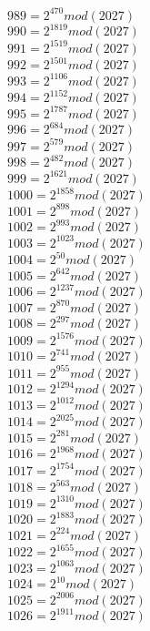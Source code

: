 \documentclass[12pt, letterpaper]{article}
\begin{document}
\begin{itemize}
\begin{multicols}{3}
$989= 2^{470} mod (2027)$\\
$990= 2^{1819} mod (2027)$\\
$991= 2^{1519} mod (2027)$\\
$992= 2^{1501} mod (2027)$\\
$993= 2^{1106} mod (2027)$\\
$994= 2^{1152} mod (2027)$\\
$995= 2^{1787} mod (2027)$\\
$996= 2^{684} mod (2027)$\\
$997= 2^{579} mod (2027)$\\
$998= 2^{482} mod (2027)$\\
$999= 2^{1621} mod (2027)$\\
$1000= 2^{1858} mod (2027)$\\
$1001= 2^{898} mod (2027)$\\
$1002= 2^{993} mod (2027)$\\
$1003= 2^{1023} mod (2027)$\\
$1004= 2^{50} mod (2027)$\\
$1005= 2^{642} mod (2027)$\\
$1006= 2^{1237} mod (2027)$\\
$1007= 2^{870} mod (2027)$\\
$1008= 2^{297} mod (2027)$\\
$1009= 2^{1576} mod (2027)$\\
$1010= 2^{741} mod (2027)$\\
$1011= 2^{955} mod (2027)$\\
$1012= 2^{1294} mod (2027)$\\
$1013= 2^{1012} mod (2027)$\\
$1014= 2^{2025} mod (2027)$\\
$1015= 2^{281} mod (2027)$\\
$1016= 2^{1968} mod (2027)$\\
$1017= 2^{1754} mod (2027)$\\
$1018= 2^{563} mod (2027)$\\
$1019= 2^{1310} mod (2027)$\\
$1020= 2^{1883} mod (2027)$\\
$1021= 2^{224} mod (2027)$\\
$1022= 2^{1655} mod (2027)$\\
$1023= 2^{1063} mod (2027)$\\
$1024= 2^{10} mod (2027)$\\
$1025= 2^{2006} mod (2027)$\\
$1026= 2^{1911} mod (2027)$\\

\end{multicols}
\end{itemize}
\end{document}
